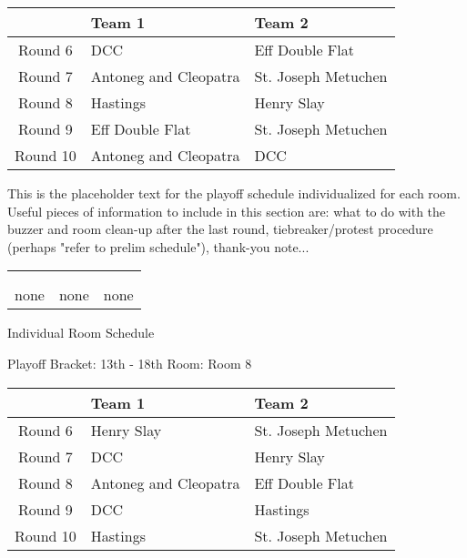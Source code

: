 \documentclass{article}%
\begin{document}
%
\begin{tabularx}{\textwidth}{|c|Y|Y|}%
\hline%
&Team 1&Team 2\\%
\hline%
Round 6&DCC&Eff Double Flat\\%
Round 7&Antoneg and Cleopatra&St. Joseph Metuchen\\%
Round 8&Hastings&Henry Slay\\%
Round 9&Eff Double Flat&St. Joseph Metuchen\\%
Round 10&Antoneg and Cleopatra&DCC\\%
\hline%
\end{tabularx}%
\vspace*{16pt}%
\linebreak%
This is the placeholder text for the playoff schedule individualized for each room. Useful pieces of information to include in this section are: what to do with the buzzer and room clean{-}up after the last round, tiebreaker/protest procedure (perhaps "refer to prelim schedule"), thank{-}you note...%
\vspace*{30pt}%
\newline%
%
\begin{tabularx}{\textwidth}{YYY}%
  &  &  \\%
\\%
none&none&none\\%
\end{tabularx}%
\newpage%
\begin{center}%
\begin{Huge}%
Individual Room Schedule%
\end{Huge}%
\vspace*{16pt}%
\linebreak%
\begin{Large}%
Playoff Bracket: 13th - 18th \hfill Room: Room 8%
\end{Large}%
\end{center}%
%
\begin{tabularx}{\textwidth}{|c|Y|Y|}%
\hline%
&Team 1&Team 2\\%
\hline%
Round 6&Henry Slay&St. Joseph Metuchen\\%
Round 7&DCC&Henry Slay\\%
Round 8&Antoneg and Cleopatra&Eff Double Flat\\%
Round 9&DCC&Hastings\\%
Round 10&Hastings&St. Joseph Metuchen\\%
\hline%
\end{tabularx}%
\end{document}
